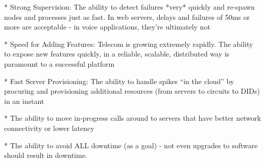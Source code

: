 * Strong Supervision: The ability to detect failures *very* quickly and re-spawn nodes and processes just as fast. In web servers, delays and failures of 50ms or more are acceptable - in voice applications, they’re ultimately not

* Speed for Adding Features: Telecom is growing extremely rapidly. The ability to expose new features quickly, in a reliable, scalable, distributed way is paramount to a successful platform

* Fast Server Provisioning: The ability to handle spikes “in the cloud” by procuring and provisioning additional resources (from servers to circuits to DIDs) in an instant

* The ability to move in-progress calls around to servers that have better network connectivity or lower latency

* The ability to avoid ALL downtime (as a goal) - not even upgrades to software should result in downtime.

